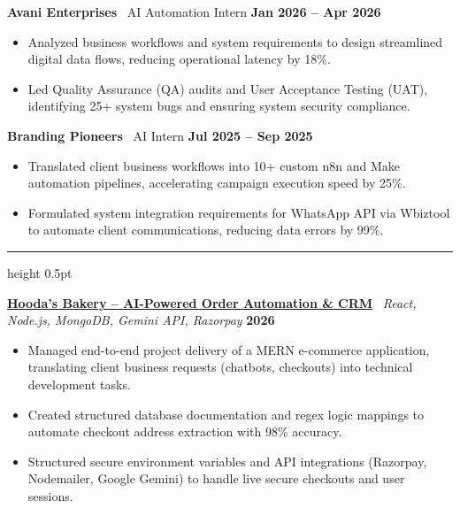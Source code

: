 \documentclass[10pt,a4paper]{article}
\newcommand{\resumesection}[2]{
  \vspace{3pt}
  \noindent{\large\bfseries\sffamily\color{navyblue}{\mbox{#1}}\hspace{6pt}{\sffamily #2}}
  \vspace{1pt}
  \hrule height 0.5pt
  \vspace{2pt}
}
\begin{document}
\vspace{3pt}

\noindent
\textbf{Avani Enterprises} \textbar\ AI Automation Intern \hfill \textbf{Jan 2026 -- Apr 2026}
\begin{itemize}[leftmargin=*, noitemsep, topsep=1pt, parsep=0.5pt, partopsep=0pt, itemsep=0.5pt]
    \item Analyzed business workflows and system requirements to design streamlined digital data flows, reducing operational latency by 18\%.
    \item Led Quality Assurance (QA) audits and User Acceptance Testing (UAT), identifying 25+ system bugs and ensuring system security compliance.
\end{itemize}

\vspace{3pt}

\noindent
\textbf{Branding Pioneers} \textbar\ AI Intern \hfill \textbf{Jul 2025 -- Sep 2025}
\begin{itemize}[leftmargin=*, noitemsep, topsep=1pt, parsep=0.5pt, partopsep=0pt, itemsep=0.5pt]
    \item Translated client business workflows into 10+ custom n8n and Make automation pipelines, accelerating campaign execution speed by 25\%.
    \item Formulated system integration requirements for WhatsApp API via Wbiztool to automate client communications, reducing data errors by 99\%.
\end{itemize}

\resumesection{\faCode}{Technical Projects}

\noindent
\href{https://hoodas-bakery.vercel.app/}{\textbf{Hooda's Bakery -- AI-Powered Order Automation \& CRM}} \textbar\ \textit{React, Node.js, MongoDB, Gemini API, Razorpay} \hfill \textbf{2026}
\begin{itemize}[leftmargin=*, noitemsep, topsep=1pt, parsep=0.5pt, partopsep=0pt, itemsep=0.5pt]
    \item Managed end-to-end project delivery of a MERN e-commerce application, translating client business requests (chatbots, checkouts) into technical development tasks.
    \item Created structured database documentation and regex logic mappings to automate checkout address extraction with 98\% accuracy.
    \item Structured secure environment variables and API integrations (Razorpay, Nodemailer, Google Gemini) to handle live secure checkouts and user sessions.
\end{itemize}
\end{document}
